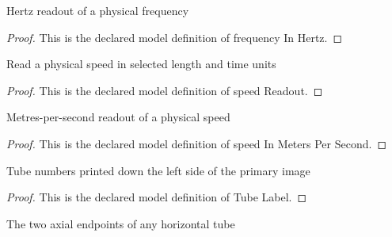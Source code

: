 \begin{definition}
  \label{def:physics:phyx-mini-0320:phyxminiproblems-problemphyxmini0320-frequencyinhertz}
  Hertz readout of a physical frequency
\end{definition}
\begin{proof}
  This is the declared model definition of frequency In Hertz.
\end{proof}
\begin{definition}
  \label{def:physics:phyx-mini-0320:phyxminiproblems-problemphyxmini0320-speedreadout}
  Read a physical speed in selected length and time units
\end{definition}
\begin{proof}
  This is the declared model definition of speed Readout.
\end{proof}
\begin{definition}
  \label{def:physics:phyx-mini-0320:phyxminiproblems-problemphyxmini0320-speedinmeterspersecond}
  Metres-per-second readout of a physical speed
\end{definition}
\begin{proof}
  This is the declared model definition of speed In Meters Per Second.
\end{proof}
\begin{definition}
  \label{def:physics:phyx-mini-0320:phyxminiproblems-problemphyxmini0320-tubelabel}
  Tube numbers printed down the left side of the primary image
\end{definition}
\begin{proof}
  This is the declared model definition of Tube Label.
\end{proof}
\begin{definition}
  \label{def:physics:phyx-mini-0320:phyxminiproblems-problemphyxmini0320-tubeendpoint}
  The two axial endpoints of any horizontal tube
\end{definition}
